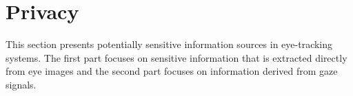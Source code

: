







\section{Privacy}
This section presents potentially sensitive information sources in eye-tracking systems. The first part focuses on sensitive information that is extracted directly from eye images and the second part focuses on information derived from gaze signals.




\begin{definition}[Sensitive information}
	
\end{definition}





















